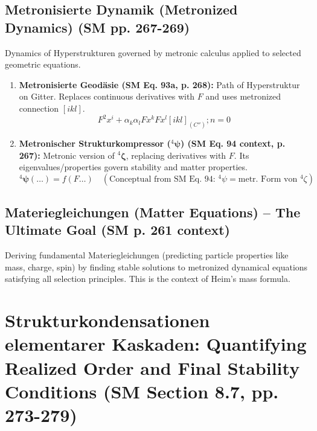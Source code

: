 \documentclass[
    12pt,              %
    a4paper,           %
    headings=normal,   %
    twoside=true,      %
    BCOR=8mm,          %
]{scrbook}
\newcommand{\metronenziffer}{n}
\newcommand{\strukturkompressor}{{}^4\bm{\zeta}}
\newcommand{\metronischerstrukturkompressor}{{}^4\bm{\psi}}
\begin{document}
\subsection{Metronisierte Dynamik (Metronized Dynamics) (SM pp. 267-269)}
\label{sec:ch11_2_3_metronisierte_dynamik}
Dynamics of Hyperstrukturen governed by metronic calculus applied to selected geometric equations.
\begin{enumerate}
    \item  \textbf{Metronisierte Geodäsie (SM Eq. 93a, p. 268):} Path of Hyperstruktur on Gitter. Replaces continuous derivatives with \(F\) and uses metronized connection \( [ikl] \).
        \begin{equation} \label{eq:original_metronized_geodesic} %
        F^2x^i + \alpha_k \alpha_l F x^k F x^l [ikl]_{(C'')} ; \metronenziffer = 0
        \end{equation}
    \item  \textbf{Metronischer Strukturkompressor (\(\metronischerstrukturkompressor\)) (SM Eq. 94 context, p. 267):} Metronic version of \(\strukturkompressor\), replacing derivatives with \(F\). Its eigenvalues/properties govern stability and matter properties.
        \begin{equation} \label{eq:original_metronized_strukturkompressor_eq_placeholder} %
        \metronischerstrukturkompressor(\dots) = f(F\dots) \quad (\text{Conceptual from SM Eq. 94: } {}^{4}\psi = \text{metr. Form von } {}^{4}\zeta)
        \end{equation}
\end{enumerate}

\subsection{Materiegleichungen (Matter Equations) – The Ultimate Goal (SM p. 261 context)}
\label{sec:ch11_2_4_materiegleichungen}
Deriving fundamental Materiegleichungen (predicting particle properties like mass, charge, spin) by finding stable solutions to metronized dynamical equations satisfying all selection principles. This is the context of Heim's mass formula.

\section{Strukturkondensationen elementarer Kaskaden: Quantifying Realized Order and Final Stability Conditions (SM Section 8.7, pp. 273-279)}
\label{sec:ch11_3_strukturkondensation}
\end{document}

